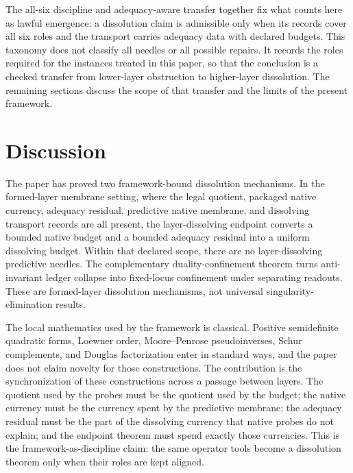 \documentclass[11pt]{article}
\theoremstyle{definition}
\begin{document}
The all-six discipline and adequacy-aware transfer together fix what
counts here as lawful emergence: a dissolution claim is admissible only
when its records cover all six roles and the transport carries adequacy
data with declared budgets.  This taxonomy does not classify all
needles or all possible repairs.  It records the roles required for the
instances treated in this paper, so that the conclusion is a checked
transfer from lower-layer obstruction to higher-layer dissolution.  The
remaining sections discuss the scope of that transfer and the limits of
the present framework.

 

\section{Discussion}
\label{sec:discussion}

The paper has proved two framework-bound dissolution mechanisms.  In
the formed-layer membrane setting, where the legal quotient, packaged
native currency, adequacy residual, predictive native membrane, and
dissolving transport records are all present, the layer-dissolving
endpoint converts a bounded native budget and a bounded adequacy
residual into a uniform dissolving budget.  Within that declared scope,
there are no layer-dissolving predictive needles.  The complementary
duality-confinement theorem turns anti-invariant ledger collapse into
fixed-locus confinement under separating readouts.  These are
formed-layer dissolution mechanisms, not universal
singularity-elimination results.

The local mathematics used by the framework is classical.  Positive
semidefinite quadratic forms, Loewner order, Moore--Penrose
pseudoinverses, Schur complements, and Douglas factorization enter in
standard ways, and the paper does not claim novelty for those
constructions.  The contribution is the synchronization of these
constructions across a passage between layers.  The quotient used by
the probes must be the quotient used by the budget; the native currency
must be the currency spent by the predictive membrane; the adequacy
residual must be the part of the dissolving currency that native probes
do not explain; and the endpoint theorem must spend exactly those
currencies.  This is the framework-as-discipline claim: the same
operator tools become a dissolution theorem only when their roles are
kept aligned.
\end{document}
